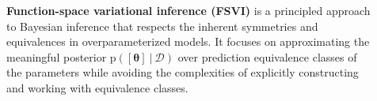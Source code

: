 \documentclass[25pt,a0paper,landscape]{tikzposter}
\DeclareMathOperator{\opExpectation}{\mathbb{E}}
\newcommand{\E}[2]{\opExpectation_{#1} \left [ #2 \right ]}
\newcommand{\MidSymbol}[1][]{\:#1\:}
\newcommand{\given}{\MidSymbol[\vert]}
\DeclareMathOperator{\opEntropy}{H}
\newcommand{\xHof}[1]{\opEntropy(#1)}
\DeclareMathOperator{\opKale}{D_\mathrm{KL}}
\newcommand{\Kale}[2]{\opKale(#1 \MidSymbol[\Vert] #2)}
\newcommand{\opp}{\mathrm{p}}
\newcommand{\pof}[1]{\opp(#1)}
\newcommand{\opq}{\mathrm{q}}
\newcommand{\qof}[1]{\opq(#1)}
\newcommand{\w}{\boldsymbol{\theta}}
\newcommand{\W}{\boldsymbol{\Theta}}
\newcommand{\Dany}{\mathcal{D}}
\begin{document}
\begin{columns}
{\begin{multicols}{2}
  \end{multicols}
}
\begin{subcolumns}
  \block{}{
    \vspace{1em}
    \nocite{burt2021understanding,cover1999elements,rudner2022tractable}
    
    
  }
\end{subcolumns}
{
  \begin{tldrbox}
    \textbf{Function-space variational inference (FSVI)} is a principled approach to Bayesian inference that respects the inherent symmetries and equivalences in overparameterized models. It focuses on approximating the meaningful posterior $\pof{[\w] \given \Dany}$ over prediction equivalence classes of the parameters while avoiding the complexities of explicitly constructing and working with equivalence classes.

\end{tldrbox}}
\end{columns}
\end{document}
